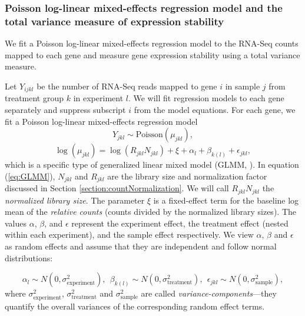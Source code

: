 \subsubsection{Poisson log-linear mixed-effects regression model and the total
	variance measure of expression stability}\label{subsection:OurMethod} 
We fit a Poisson log-linear mixed-effects regression model to the
RNA-Seq counts mapped to each gene and measure gene expression stability using
a total variance measure.

Let $Y_{ijkl}$ be the number of RNA-Seq reads mapped to gene
$i$ in sample $j$ from treatment group $k$  in experiment $l$. We will fit
regression models to each gene separately and suppress subscript $i$ from the
model equations.  For each gene, we fit a Poisson log-linear mixed-effects regression model 
\begin{equation}
Y_{jkl} \sim \text{Poisson}(\mu_{jkl}),
\end{equation}
\begin{equation}\label{eq:GLMM}
\log( \mu_{jkl}) = \log(R_{jkl}N_{jkl})+ \xi + \alpha_l + \beta_{k(l)} + \epsilon_{jkl},
\end{equation}
which is a specific type of generalized linear mixed model (GLMM, 
\citet{mcculloch2001generalized}). 
In equation (\ref{eq:GLMM}), $N_{jkl}$ and $R_{jkl}$ are the library size and normalization factor 
discussed in
Section \ref{section:countNormalization}. We will call $R_{jkl}N_{jkl}$ 
the \textit{normalized library size}.
The parameter $\xi$ is a fixed-effect term for the baseline log mean of the {\em relative
	counts} (counts divided by the normalized library sizes). 
The values $\alpha$, $\beta$, and $\epsilon$ %
represent the experiment effect, the treatment effect (nested within each
experiment), and the sample effect respectively. 
We view  $\alpha$, $\beta$ and $\epsilon$ as random effects and assume that
they are independent and follow normal distributions:

\begin{equation}\label{eq:normalassumption}
\alpha_l\sim N(0, \sigma^2_{\text{experiment}}),~~
\beta_{k(l)}\sim N(0, \sigma^2_{\text{treatment}}),~~
\epsilon_{jkl}\sim N(0, \sigma_{\text{sample}}^2),
\end{equation}
where $\sigma_{\text{experiment}}^2$, $\sigma_{\text{treatment}}^2$ and
$\sigma_{\text{sample}}^2$ are called \textit{variance-components}---they
quantify the overall variances of the corresponding random effect terms. 


